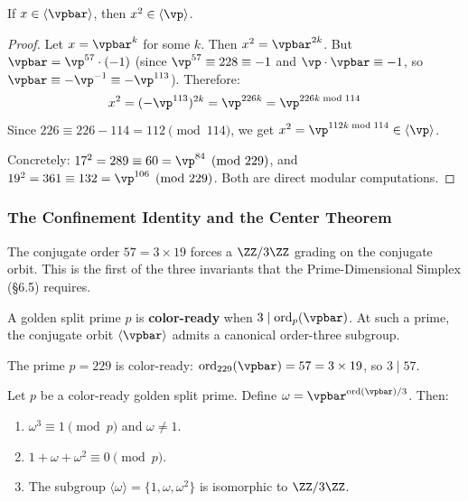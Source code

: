\begin{proposition}\label{prop:square-cross}
If $x \in \langle\vpbar\rangle$, then $x^2 \in \langle\vp\rangle$.
\end{proposition}
\begin{proof}
Let $x = \vpbar^k$ for some $k$. Then $x^2 = \vpbar^{2k}$. But $\vpbar = \vp^{57} \cdot (-1)$ (since $\vp^{57} \equiv 228 \equiv -1$ and $\vp \cdot \vpbar \equiv -1$, so $\vpbar \equiv -\vp^{-1} \equiv -\vp^{113}$). Therefore:
$$x^2 = (-\vp^{113})^{2k} = \vp^{226k} = \vp^{226k \bmod 114}$$
Since $226 \equiv 226 - 114 = 112 \pmod{114}$, we get $x^2 = \vp^{112k \bmod 114} \in \langle\vp\rangle$.

Concretely: $17^2 = 289 \equiv 60 = \vp^{84} \pmod{229}$, and $19^2 = 361 \equiv 132 = \vp^{106} \pmod{229}$. Both are direct modular computations. \qedhere
\end{proof}

\subsubsection*{The Confinement Identity and the Center Theorem}

The conjugate order $57 = 3 \times 19$ forces a $\ZZ/3\ZZ$ grading on the conjugate orbit. This is the first of the three invariants that the Prime-Dimensional Simplex (\S6.5) requires.

\begin{definition}\label{def:color-ready}
A golden split prime $p$ is \textbf{color-ready} when $3 \mid \mathrm{ord}_p(\vpbar)$. At such a prime, the conjugate orbit $\langle\vpbar\rangle$ admits a canonical order-three subgroup.
\end{definition}

The prime $p = 229$ is color-ready: $\mathrm{ord}_{229}(\vpbar) = 57 = 3 \times 19$, so $3 \mid 57$.

\begin{theorem}\label{thm:confinement}
Let $p$ be a color-ready golden split prime. Define $\omega = \vpbar^{\mathrm{ord}(\vpbar)/3}$. Then:
\begin{enumerate}
\item $\omega^3 \equiv 1 \pmod{p}$ and $\omega \neq 1$.
\item $1 + \omega + \omega^2 \equiv 0 \pmod{p}$.
\item The subgroup $\langle\omega\rangle = \{1, \omega, \omega^2\}$ is isomorphic to $\ZZ/3\ZZ$.
\end{enumerate}
\end{theorem}

